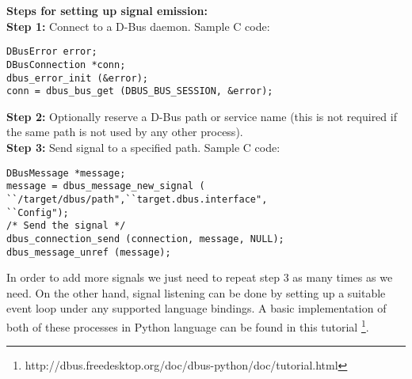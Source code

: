 \textbf{Steps for setting up signal emission:}\\
\textbf{Step 1:} Connect to a D-Bus daemon. Sample C code:
\lstset{language=C,basicstyle=\small}
\begin{lstlisting}
DBusError error;
DBusConnection *conn;
dbus_error_init (&error);
conn = dbus_bus_get (DBUS_BUS_SESSION, &error);
\end{lstlisting}
\textbf{Step 2:} Optionally reserve a D-Bus path or service name (this is not required if the same path is not used by any other process).\\
\textbf{Step 3:} Send signal to a specified path. Sample C code:
\begin{lstlisting} 
DBusMessage *message;
message = dbus_message_new_signal (
``/target/dbus/path",``target.dbus.interface",
``Config");
/* Send the signal */
dbus_connection_send (connection, message, NULL);
dbus_message_unref (message);
\end{lstlisting}
In order to add more signals we just need to repeat step 3 as many times as we need. On the other hand, signal listening can be done by setting up a suitable event loop under any supported language bindings. A basic implementation of both of these processes in Python language can be found in this tutorial \footnote{http://dbus.freedesktop.org/doc/dbus-python/doc/tutorial.html}. 

